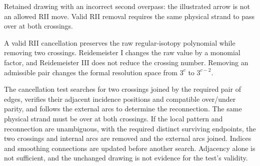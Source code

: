 \begin{center}

\small
Retained drawing with an incorrect second overpass: the illustrated arrow is not an allowed RII move. Valid RII removal requires the same physical strand to pass over at both crossings.
\end{center}

A valid RII cancellation preserves the raw regular-isotopy polynomial while removing two crossings. Reidemeister I changes the raw value by a monomial factor, and Reidemeister III does not reduce the crossing number. Removing an admissible pair changes the formal resolution space from $3^c$ to $3^{c-2}$.

The cancellation test searches for two crossings joined by the required pair of edges, verifies their adjacent incidence positions and compatible over/under parity, and follows the external arcs to determine the reconnection. The same physical strand must be over at both crossings. If the local pattern and reconnection are unambiguous, with the required distinct surviving endpoints, the two crossings and internal arcs are removed and the external arcs joined. Indices and smoothing connections are updated before another search. Adjacency alone is not sufficient, and the unchanged drawing is not evidence for the test's validity.


